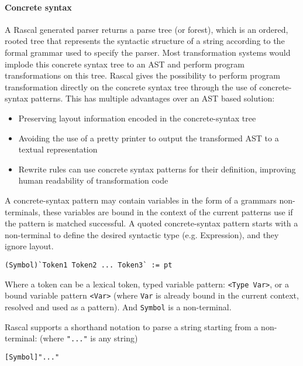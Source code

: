 \paragraph{Concrete syntax}
A Rascal generated parser returns a parse tree (or forest), which is an ordered, rooted tree that represents the syntactic structure of a string according to the formal grammar used to specify the parser. Most transformation systems would implode this concrete syntax tree to an AST and perform program transformations on this tree. Rascal gives the possibility to perform program transformation directly on the concrete syntax tree through the use of concrete-syntax patterns. This has multiple advantages over an AST based solution:
\begin{itemize}
	\item Preserving layout information encoded in the concrete-syntax tree
	\item Avoiding the use of a pretty printer to output the transformed AST to a textual representation
	\item Rewrite rules can use concrete syntax patterns for their definition, improving human readability of transformation code
\end{itemize}
A concrete-syntax pattern may contain variables in the form of a grammars non-terminals, these variables are bound in the context of the current patterns use if the pattern is matched successful. A quoted concrete-syntax pattern starts with a non-terminal to define the desired syntactic type (e.g. Expression), and they ignore layout.

\begin{lstlisting}
(Symbol)`Token1 Token2 ... Token3` := pt
\end{lstlisting}

Where a token can be a lexical token, typed variable pattern: \lstinline$<Type Var>$, or a bound variable pattern \lstinline$<Var>$ (where \lstinline$Var$ is already bound in the current context, resolved and used as a pattern). And \lstinline$Symbol$ is a non-terminal.

Rascal supports a shorthand notation to parse a string starting from a non-terminal: (where \lstinline$"..."$ is any string)

\begin{lstlisting}
[Symbol]"..."
\end{lstlisting}

